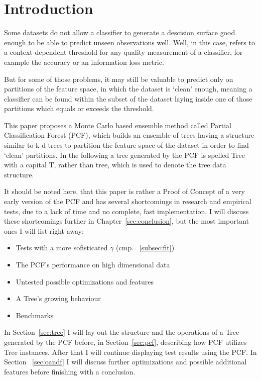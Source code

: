 \section{Introduction}

Some datasets do not allow a classifier to generate a
descision surface good enough to be able to predict unseen
observations well. Well, in this case, refers to a
context dependent threshold for any quality measurement of
a classifier, for example the accuracy or an information
loss metric.

But for some of those problems, it may still be valuable
to predict only on partitions of the feature space, in
which the dataset is `clean' enough, meaning a classifier
can be found within the subset of the dataset laying inside
one of those partitions which equals or exceeds the
threshold.

This paper proposes a Monte Carlo based ensemble method
called Partial Classification Forest (PCF), which builds an
ensemble of trees having a structure similar to
k-d trees to partition the feature space of the dataset in
order to find `clean' partitions. In the following a
tree generated by the PCF is spelled Tree with a capital
T, rather than tree, which is used to denote the tree data
structure.

It should be noted here, that this paper is rather a Proof
of Concept of a very early version of the PCF and has
several shortcomings in research and empirical tests, due
to a lack of time and no complete, fast implementation. I
will discuss these shortcomings further in
Chapter~\ref{sec:conclusion}, but the most important ones I
will list right away:

\begin{itemize}

\item Tests with a more sofisticated $\gamma$ (cmp.~%
      \ref{subsec:fit})

\item The PCF's performance on high dimensional data

\item Untested possible optimizations and features

\item A Tree's growing behaviour

\item Benchmarks

\end{itemize}

In Section~\ref{sec:tree} I will lay out
the structure and the operations of a Tree generated by the
PCF before, in Section~\ref{sec:pcf}, describing how PCF
utilizes Tree instances. After that I will continue
displaying test results using the PCF\@. In Section~%
\ref{sec:oandf} I will discuss further optimizations and
possible additional features before finishing with a
conclusion.

